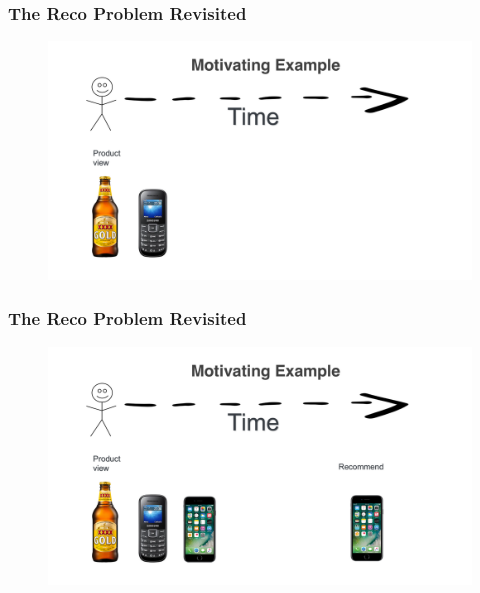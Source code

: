 


\begin{frame}
  \frametitle{The Reco Problem Revisited}
 
 
   \begin{figure}[h!]
     \includegraphics[scale=0.3]{images/mot_ex1.png}
       \centering
       \label{motex1}
   \end{figure}
     
 \end{frame}



 \begin{frame}
  \frametitle{The Reco Problem Revisited}
 
 
   \begin{figure}[h!]
     \includegraphics[scale=0.3]{images/mot_ex2.png}
       \centering
       \label{motex1}
   \end{figure}
     
 \end{frame}

